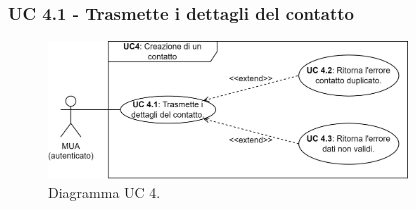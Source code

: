\subsubsection{UC 4.1 - Trasmette i dettagli del contatto} \label{sec:UC4.1}
    \begin{figure}[h]
        \includegraphics[width=0.85\textwidth]{sections/uc_imgs/UC04.X.png}
        \centering
        \caption{Diagramma UC 4.}
    \end{figure}
